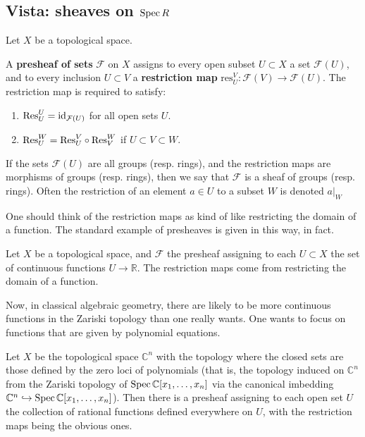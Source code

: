 \subsection{Vista: sheaves on $\operatorname{Spec} R$}

Let $X$ be a topological space. 
\begin{definition} 
A \textbf{presheaf of sets} $\mathcal{F}$ on $X$ assigns to every open subset
$U \subset X$ a set $\mathcal{F} (U)$, and to every inclusion $U \subset V$ a
\textbf{restriction map}
$\mathrm{res}^V_U : \mathcal{F}(V) \to \mathcal{F}(U)$. The restriction map is
required to satisfy:
\begin{enumerate}
\item $\mathrm{Res}^U_U = \operatorname{id}_{\mathcal{F}(U)} $ for all open sets $U$.
\item $\mathrm{Res}^W_U = \mathrm{Res}^V_U \circ \mathrm{Res}^W_V $ if $U \subset V \subset W$.
\end{enumerate}

If the sets $\mathcal{F}(U)$ are all groups (resp. rings), and the restriction
maps are morphisms of groups (resp. rings), then we say that $\mathcal{F}$ is a
sheaf of groups (resp. rings). Often the restriction of an element $a\in U$ to a subset $W$ is denoted $a|_W$
\end{definition} 


One should think of the restriction maps as kind of like restricting the
domain of a function.
The standard example of presheaves is given in this way, in fact.
\begin{example} 
Let $X$ be a topological space, and $\mathcal{F}$ the presheaf assigning to
each $U \subset X$ the set of continuous functions $U \to \mathbb{R}$. The
restriction maps come from restricting the domain of a function.
\end{example} 

Now, in classical algebraic geometry, there are likely to be more
continuous functions in the Zariski topology than one really wants. One wants
to focus on functions that are given by polynomial equations.

\begin{example} 
Let $X$ be the topological space $\mathbb{C}^n$ with the topology where the
closed sets are those defined by the zero loci of polynomials (that is, the
topology induced on $\mathbb{C}^n$ from the Zariski topology of $\operatorname{Spec}
\mathbb{C}[x_1, \dots, x_n]$ via the canonical imbedding $\mathbb{C}^n
\hookrightarrow \operatorname{Spec} \mathbb{C}[x_1, \dots, x_n]$). Then there is a presheaf
assigning to each open set $U$ the collection of rational functions defined
everywhere on $U$, with the  restriction maps being the obvious ones.
\end{example} 

